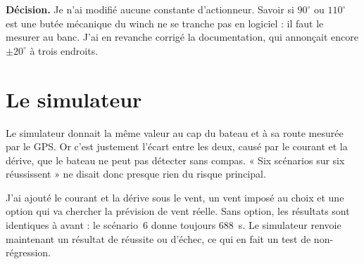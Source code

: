 \documentclass[11pt,a4paper]{article}
\begin{document}
\begin{alert}
\textbf{Décision.} Je n'ai modifié aucune constante d'actionneur. Savoir si $90^\circ$ ou $110^\circ$ est une butée
mécanique du winch ne se tranche pas en logiciel : il faut le mesurer au banc. J'ai en revanche corrigé la documentation,
qui annonçait encore $\pm 20^\circ$ à trois endroits.
\end{alert}

\section{Le simulateur}

Le simulateur donnait la même valeur au cap du bateau et à sa route mesurée par le GPS. Or c'est justement l'écart
entre les deux, causé par le courant et la dérive, que le bateau ne peut pas détecter sans compas. « Six scénarios sur
six réussissent » ne disait donc presque rien du risque principal.

\begin{center}
\end{center}

J'ai ajouté le courant et la dérive sous le vent, un vent imposé au choix et une option qui va chercher la prévision de
vent réelle. Sans option, les résultats sont identiques à avant : le scénario~6 donne toujours 688~s. Le simulateur
renvoie maintenant un résultat de réussite ou d'échec, ce qui en fait un test de non-régression.
\end{document}
